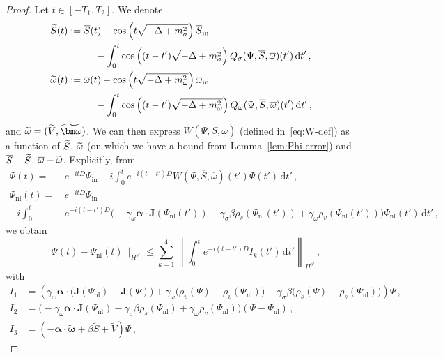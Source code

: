 \documentclass[10pt]{amsart}
\theoremstyle{definition}\newtheorem{defi}[theo]{Definition}\newtheorem{rema}[theo]{Remark}\newtheorem{exam}[theo]{Example}\newtheorem{exem}[theo]{Example}\newtheorem{nota}[theo]{Notation}
\newcommand{\rmin}{\mathrm{in}}
\newcommand{\nl}{\mathrm{nl}}
\renewcommand\tilde{\widetilde}
\renewcommand\d[1]{{\ensuremath{\,\text{d}#1}}}
\let\oldtilde\tilde
\renewcommand*{\tilde}[1]{\mathchoice{\widetilde{#1}}{\widetilde{#1}}{\oldtilde{#1}}{\oldtilde{#1}}}
\begin{document}
\begin{proof}
Let $t\in [-T_1,T_2]$. We denote
\begin{equation}\label{eq:tilde-fields}
\begin{split}
\tilde S(t)&:=\overline{S}(t)- \cos\left(t\sqrt{-\Delta + m^2_\sigma}\right)\overline{S}_\rmin \\
&\mkern50mu-\int_0^t\cos\left((t-t')\sqrt{-\Delta + m^2_\sigma}\right) Q_\sigma(\Psi,\overline{S}, \overline{\omega})(t')\d t'\,,\\
\tilde \omega(t)&:=\overline\omega(t)-\cos\left(t\sqrt{-\Delta + m^2_\omega}\right)\overline\omega_\rmin \\
&\mkern50mu-\int_0^t\cos\left((t-t')\sqrt{-\Delta + m^2_\omega}\right) Q_\omega(\Psi,\overline{S}, \overline{\omega})(t')\d t'\,,
\end{split}
\end{equation}
and $\tilde \omega =(\tilde V, \tilde{\bm\omega})$. We can then express $W(\Psi, \overline{S}, \overline{\omega})$ (defined in~\eqref{eq:W-def}) as a function of $\tilde S$, $\tilde \omega$ (on which we have a bound from Lemma~\ref{lem:Phi-error}) and $\overline{S}-\tilde{S}$, $\overline{\omega}-\tilde{\omega}$. Explicitly, from
\begin{align*}
\Psi(t) = &e^{-itD}\Psi_\rmin -i\int_0^te^{-i(t-t')D}W(\Psi, \overline{S}, \overline{\omega})(t')\Psi(t')\d t'\,,\\
\Psi_{\nl}(t) =\, &e^{-itD}\Psi_\rmin\\
-i\int_0^t &e^{-i(t-t')D}\big(-\gamma_\omega{\bm\alpha}\cdot {\bm J}(\Psi_\nl(t'))-\gamma_\sigma\beta \rho_s(\Psi_{\nl}(t'))+\gamma_\omega\rho_v(\Psi_{\nl}(t'))\big)\Psi_{\nl}(t')\d t'\,,
\end{align*}
we obtain
\begin{equation}\label{eq:Psi diff}
\|\Psi_{}(t) -\Psi_{\nl}(t) \|_{H^{s'}}\leq \sum_{k=1}^4\left\|\int_0^te^{-i(t-t')D}I_k (t')\d t'\right\|_{H^{s'}}\,,
\end{equation}
with
\begin{align}
I_1&= \left(
\gamma_\omega {\bm\alpha}\cdot \big({\bm J}(\Psi_\nl) -{\bm J}(\Psi)\big) +\gamma_\omega\big(\rho_v(\Psi) - \rho_v(\Psi_{\nl})\big) -\gamma_\sigma \beta\big(\rho_s(\Psi) - \rho_s(\Psi_{\nl})\big)
\right)\Psi\,,\\
I_2&= \big(-\gamma_\omega{\bm\alpha}\cdot {\bm J}(\Psi_\nl)-\gamma_\sigma\beta \rho_s(\Psi_{\nl})+\gamma_\omega\rho_v(\Psi_{\nl})\big)(\Psi-\Psi_\nl) \,,
\\
I_3&=
\left(-\bm\alpha\cdot \widetilde{\bm \omega_{}}+\beta \widetilde{S}+\widetilde{V}\right)\Psi\,,

\end{align}
\end{proof}
\end{document}
